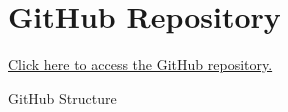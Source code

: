 \chapter{GitHub Repository}
\href{https://github.com/zuhayrl/eee4022S_thesis}{Click here to access the GitHub repository.}

\Huge{GitHub Structure}

